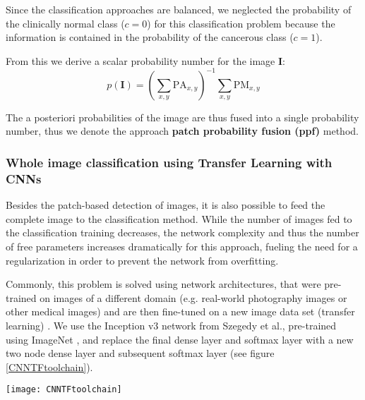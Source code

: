 \documentclass[fleqn,10pt]{wlscirep}
\begin{document}
Since the classification approaches are balanced, we neglected the
probability of the clinically normal class ($c=0$) for this classification problem because the information
is contained in the probability of the cancerous class ($c=1$).

From this we derive a scalar probability number for the image \textbf{I}:
\begin{equation}
     p(\mathbf{I}) = \left( \sum_{x,y} \mathrm{PA}_{x,y} \right)^{-1}
     \sum_{x,y} \mathrm{PM}_{x,y}
    \label{eqn:ppf}
\end{equation}






The a posteriori probabilities of the image are thus fused into a
single probability number, thus we denote the approach \textbf{patch probability
  fusion (ppf)} method.


\vspace{0.5em}
\subsubsection{Whole image classification using Transfer Learning with CNNs}
\label{CNNimageDet}

Besides the patch-based detection of images, it is also possible to feed the complete image to the classification method. While the number of images fed to the classification training decreases, the network complexity and thus the number of free parameters increases dramatically for this approach, fueling the need for a regularization in order to prevent the network from overfitting.

Commonly, this problem is solved using network architectures, that were pre-trained on images of a different domain (e.g. real-world photography images or other medical images) and are then fine-tuned on a new image data set (transfer learning) \cite{Shin:cx,Esteva:2017ct}. We use the Inception v3 network from Szegedy et al.\cite{Szegedy:2016cv}, pre-trained using ImageNet \cite{imagenet_cvpr09}, and replace the final dense layer and softmax layer with a new two node dense layer and subsequent softmax layer (see figure \ref{CNNTFtoolchain}).

\begin{figure*}[!t]
\centering
\texttt{[image: CNNTFtoolchain]}
\hfil
\caption{Overview of the transfer learning approach, based on Szegedy's Inception v3 \cite{Szegedy:2016cv}, pre-trained on the ImageNet database \cite{imagenet_cvpr09} }
\label{CNNTFtoolchain}
\end{figure*}
\end{document}
